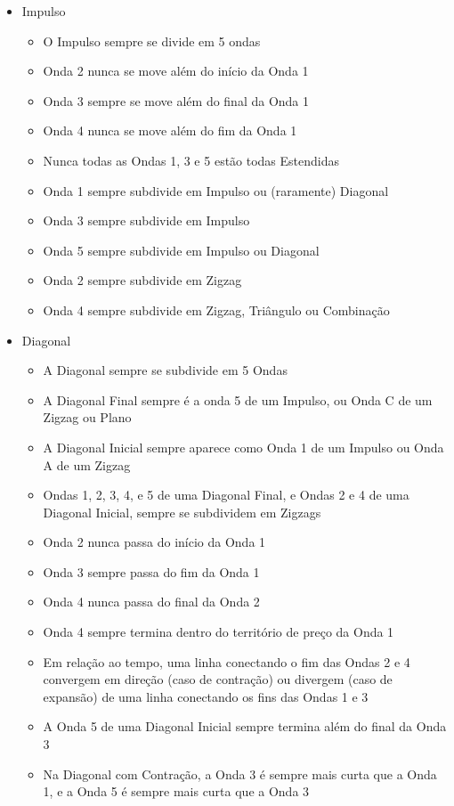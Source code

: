 \documentclass[12pt]{article}
\begin{document}
\begin{itemize}
	\item Impulso
	\begin{itemize}
		\item O Impulso sempre se divide em 5 ondas
		\item Onda 2 nunca se move além do início da Onda 1
		\item Onda 3 sempre se move além do final da Onda 1
		\item Onda 4 nunca se move além do fim da Onda 1
		\item Nunca todas as Ondas 1, 3 e 5 estão todas Estendidas
		\item Onda 1 sempre subdivide em Impulso ou (raramente) Diagonal
		\item Onda 3 sempre subdivide em Impulso
		\item Onda 5 sempre subdivide em Impulso ou Diagonal
		\item Onda 2 sempre subdivide em Zigzag
		\item Onda 4 sempre subdivide em Zigzag, Triângulo ou Combinação
	\end{itemize}
	\item Diagonal
	\begin{itemize}
		\item A Diagonal sempre se subdivide em 5 Ondas
		\item A Diagonal Final sempre é a onda 5 de um Impulso, ou Onda C de um Zigzag ou Plano
		\item A Diagonal Inicial sempre aparece como Onda 1 de um Impulso ou Onda A de um Zigzag
		\item Ondas 1, 2, 3, 4, e 5 de uma Diagonal Final, e Ondas 2 e 4 de uma Diagonal Inicial, sempre se subdividem em Zigzags
		\item Onda 2 nunca passa do início da Onda 1
		\item Onda 3 sempre passa do fim da Onda 1
		\item Onda 4 nunca passa do final da Onda 2
		\item Onda 4 sempre termina dentro do território de preço da Onda 1
		\item Em relação ao tempo, uma linha conectando o fim das Ondas 2 e 4 convergem em direção (caso de contração) ou divergem (caso de expansão) de uma linha conectando os fins das Ondas 1 e 3
		\item A Onda 5 de uma Diagonal Inicial sempre termina além do final da Onda 3
		\item Na Diagonal com Contração, a Onda 3 é sempre mais curta que a Onda 1, e a Onda 5 é sempre mais curta que a Onda 3

\end{itemize}
\end{itemize}
\end{document}
